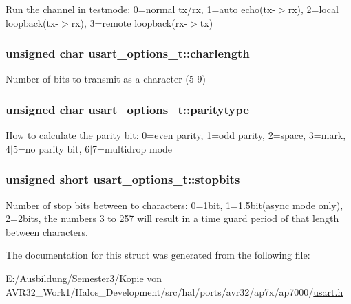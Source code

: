 Run the channel in testmode: 0=normal tx/rx, 1=auto echo(tx-$>$rx), 2=local loopback(tx-$>$rx), 3=remote loopback(rx-$>$tx) \hypertarget{structusart__options__t_a6b77cc05829d2e70ee7f96194c6ce23}{
\subsubsection[{charlength}]{\setlength{\rightskip}{0pt plus 5cm}unsigned char {\bf usart\_\-options\_\-t::charlength}}}
\label{structusart__options__t_a6b77cc05829d2e70ee7f96194c6ce23}


Number of bits to transmit as a character (5-9) \hypertarget{structusart__options__t_85401f7a6f516a5883adc0538dc27f8e}{
\subsubsection[{paritytype}]{\setlength{\rightskip}{0pt plus 5cm}unsigned char {\bf usart\_\-options\_\-t::paritytype}}}
\label{structusart__options__t_85401f7a6f516a5883adc0538dc27f8e}


How to calculate the parity bit: 0=even parity, 1=odd parity, 2=space, 3=mark, 4$|$5=no parity bit, 6$|$7=multidrop mode \hypertarget{structusart__options__t_433a6ede2186d42b4cf19ef4b370cd61}{
\subsubsection[{stopbits}]{\setlength{\rightskip}{0pt plus 5cm}unsigned short {\bf usart\_\-options\_\-t::stopbits}}}
\label{structusart__options__t_433a6ede2186d42b4cf19ef4b370cd61}


Number of stop bits between to characters: 0=1bit, 1=1.5bit(async mode only), 2=2bits, the numbers 3 to 257 will result in a time guard period of that length between characters. 

The documentation for this struct was generated from the following file:\begin{CompactItemize}
\item 
E:/Ausbildung/Semester3/Kopie von AVR32\_\-Work1/Halos\_\-Development/src/hal/ports/avr32/ap7x/ap7000/\hyperlink{usart_8h}{usart.h}\end{CompactItemize}
